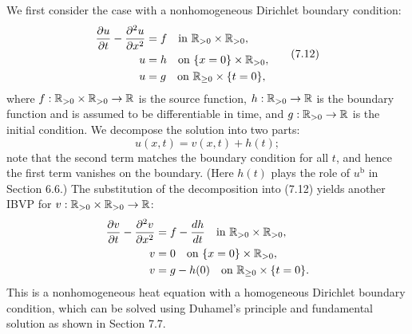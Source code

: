 We first consider the case with a nonhomogeneous Dirichlet boundary condition:
\begin{equation*}
    \begin{aligned}
        \frac{\partial u}{\partial t} - \frac{\partial^2 u}{\partial x^2} &= f \quad \text{in } \mathbb{R}_{>0} \times \mathbb{R}_{>0}, \\
        u &= h \quad \text{on } \{x = 0\} \times \mathbb{R}_{>0}, \\
        u &= g \quad \text{on } \mathbb{R}_{\geq 0} \times \{t = 0\},
    \end{aligned} \tag{7.12}
\end{equation*}
where $f : \mathbb{R}_{>0} \times \mathbb{R}_{>0} \to \mathbb{R}$ is the source function, $h : \mathbb{R}_{>0} \to \mathbb{R}$ is the boundary function and is assumed to be differentiable in time, and $g : \mathbb{R}_{>0} \to \mathbb{R}$ is the initial condition. We decompose the solution into two parts:
\[u(x, t) = v(x, t) + h(t);\]
note that the second term matches the boundary condition for all $t$, and hence the first term vanishes on the boundary. (Here $h(t)$ plays the role of $u^{\mathrm{b}}$ in Section 6.6.) The substitution of the decomposition into (7.12) yields another IBVP for $v : \mathbb{R}_{>0} \times \mathbb{R}_{>0} \to \mathbb{R}$:
\begin{align*}
    \frac{\partial v}{\partial t} - \frac{\partial^2 v}{\partial x^2} &= f - \frac{dh}{dt} \quad \text{in } \mathbb{R}_{>0} \times \mathbb{R}_{>0}, \\
    v &= 0 \quad \text{on } \{x = 0\} \times \mathbb{R}_{>0}, \\
    v &= g - h(0) \quad \text{on } \mathbb{R}_{\geq 0} \times \{t = 0\}.
\end{align*}
This is a nonhomogeneous heat equation with a homogeneous Dirichlet boundary condition, which can be solved using Duhamel's principle and fundamental solution as shown in Section 7.7.

